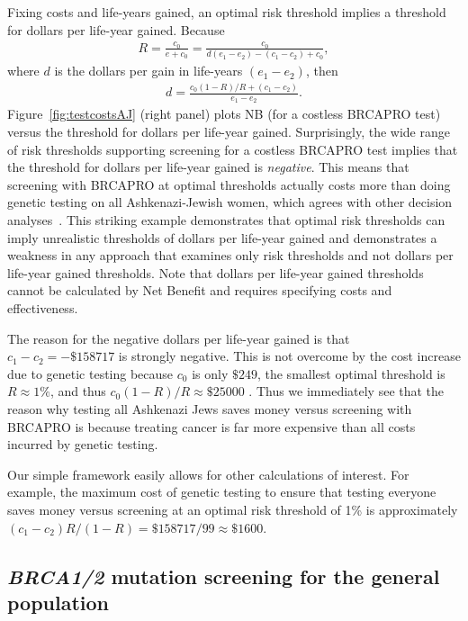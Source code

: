 \documentclass[11pt, letterpaper]{article}
\begin{document}
Fixing costs and life-years gained, an optimal risk threshold implies a threshold for dollars per life-year gained.  Because
\begin{eqnarray*}
	R = \frac{c_0}{e+c_0} = \frac{c_0}{d(e_1-e_2)-(c_1-c_2) +c_0},
\end{eqnarray*}
where $d$ is the dollars per gain in life-years $(e_1-e_2)$, then
\begin{eqnarray}
\label{eq:dollarsperLYG}
	d = \frac{c_0(1-R)/R + (c_1-c_2)}{e_1-e_2}.
\end{eqnarray}
Figure~\ref{fig:testcostsAJ} (right panel) plots NB (for a costless BRCAPRO test) versus the threshold for dollars per life-year gained.   Surprisingly, the wide range of risk thresholds supporting screening for a costless BRCAPRO test implies that the threshold for dollars per life-year gained is \textit{negative}.  This means that screening with BRCAPRO at optimal thresholds actually costs more than doing genetic testing on all Ashkenazi-Jewish women, which agrees with other decision analyses~\citep{Long2015,Manchanda2015}.   This striking example demonstrates that optimal risk thresholds can imply unrealistic thresholds of dollars per life-year gained and demonstrates a weakness in any approach that examines only risk thresholds and not dollars per life-year gained thresholds.  Note that dollars per life-year gained thresholds cannot be calculated by Net Benefit and requires specifying costs and effectiveness.

The reason for the negative dollars per life-year gained is that $c_1-c_2=-\$158717$ is strongly negative.  This is not overcome by the cost increase due to genetic testing because $c_0$ is only $\$249$, the smallest optimal threshold is $R\approx1\%$, and thus $c_0(1-R)/R\approx\$25000$ . Thus we immediately see that the reason why testing all Ashkenazi Jews saves money versus screening with BRCAPRO is because treating cancer is far more expensive than all costs incurred by genetic testing.  

Our simple framework easily allows for other calculations of interest.  For example, the maximum cost of genetic testing to ensure that testing everyone saves money versus screening at an optimal risk threshold of 1\% is approximately $(c_1-c_2)R/(1-R)=\$158717/99\approx\$1600$.  


\subsection{\textit{BRCA1/2} mutation screening for the general population}
\label{sec:BRCAgenpop}
\end{document}
